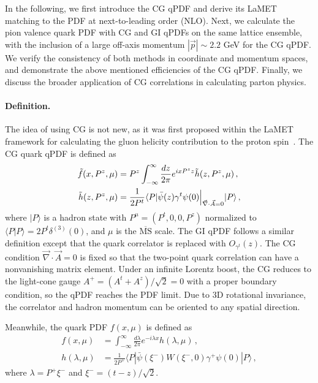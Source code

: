 \documentclass[prd,twocolumn,preprintnumbers,showpacs,nofootinbib,superscriptaddress,notitlepage,floatfix]{revtex4-1}
\newcommand{\MS}{{\overline{\mathrm{MS}}}}
\begin{document}
In the following, we first introduce the CG qPDF and derive its LaMET matching to the PDF at next-to-leading order (NLO). Next, we calculate the pion valence quark PDF with CG and GI qPDFs on the same lattice ensemble, with the inclusion of a large off-axis momentum $|\vec{p}|\sim2.2$ GeV for the CG qPDF. 
We verify the consistency of both methods in coordinate and momentum spaces, and demonstrate the above mentioned efficiencies of the CG qPDF. 
Finally, we discuss the broader application of CG correlations in calculating parton physics.

\paragraph*{Definition.} The idea of using CG is not new, as it was first proposed within the LaMET framework for calculating the gluon helicity contribution to the proton spin~\cite{Ji:2013fga,Hatta:2013gta,Ji:2014lra,Yang:2016plb}.
The CG quark qPDF is defined as
\begin{align}
    \tilde f(x,P^z,\mu) &= P^z\int_{-\infty}^\infty \frac{dz}{2\pi} e^{i x P^z z} \tilde h(z,P^z,\mu)\,,\\
    \tilde h(z,P^z,\mu) &= {1\over 2P^t}\langle P| \bar{\psi}(z)\gamma^t \psi(0)\Big|_{\vec{\nabla}\cdot \vec{A}=0}|P\rangle\,,
\end{align}
where $|P\rangle$ is a hadron state with $P^\mu=(P^t,0,0,P^z)$ normalized to $\langle P|P\rangle = 2P^t\delta^{(3)}(0)$, and $\mu$ is the $\MS$ scale. The GI qPDF follows a similar definition except that the quark correlator is replaced with $O_{\gamma^t}(z)$. The CG condition $\vec{\nabla}\cdot \vec{A}=0$ is fixed so that the two-point quark correlation can have a nonvanishing matrix element. Under an infinite Lorentz boost, the CG reduces to the light-cone gauge $A^+=(A^t+A^z)/\sqrt{2}=0$ with a proper boundary condition, so the qPDF reaches the PDF limit. Due to 3D rotational invariance, the correlator and hadron momentum can be oriented to any spatial direction.

Meanwhile, the quark PDF $f(x,\mu)$ is defined as
\begin{align}
    f(x,\mu) &= \int_{-\infty}^\infty \frac{d\lambda}{2\pi} e^{-i\lambda x} h(\lambda,\mu)\,,\\
    h(\lambda,\mu) &= \frac{1}{2P^+} \langle P| \bar{\psi}(\xi^-)W(\xi^-,0) \gamma^+ \psi(0)|P\rangle\,,
\end{align}
where $\lambda=P^+\xi^-$ and $\xi^- = (t- z)/\sqrt{2}$.
\end{document}
